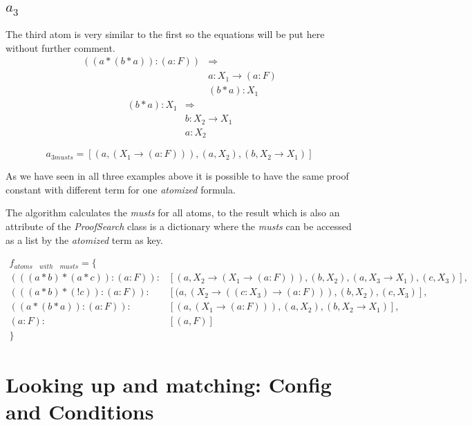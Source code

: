 \subsection[Third atom]{$a_3$}
The third atom is very similar to the first so the equations will be put here without further comment.
\begin{equation}\label{example_atom3_must}
\begin{split}
	((a*(b * a)):(a:F)) & \Rightarrow \\
	& a : X_1 \rightarrow (a:F) \\
	& (b * a) : X_1
\end{split}
\end{equation}
\begin{equation}\label{example_atom3_must2}
\begin{split}
	(b * a) : X_1  & \Rightarrow \\
	& b: X_2 \rightarrow X_1  \\
	& a: X_2
\end{split}
\end{equation}

\begin{equation}
	a_{3 musts} = [(a, (X_1 \rightarrow (a:F))), (a, X_2), (b, X_2 \rightarrow X_1)]
\end{equation}

As we have seen in all three examples above it is possible to have the same proof constant with different term for one \emph{atomized} formula.

\bigskip
The algorithm calculates the \emph{musts} for all atoms, to the result which is also an attribute of the \emph{ProofSearch} class is a dictionary where the \emph{musts} can be accessed as a list by the \emph{atomized} term as key.

\begin{equation}\label{f_musts}
\begin{split}
	f_{atoms \quad with \quad musts} = \{\\
	(((a * b)*(a * c)):(a:F)): & [(a, X_2 \rightarrow (X_1 \rightarrow (a:F))), (b, X_2), (a, X_3 \rightarrow X_1), (c, X_3)], \\
	 (((a * b)*(! c)):(a:F)): & [(a, (X_2 \rightarrow ((c:X_3) \rightarrow (a:F))), (b, X_2), (c, X_3)], \\
	 ((a*(b * a)):(a:F)): & [(a, (X_1 \rightarrow (a:F))), (a, X_2), (b, X_2 \rightarrow X_1 )], \\
	 (a:F): & [(a, F)]\\
	\}
\end{split}
\end{equation}
%

\section{Looking up and matching: Config and Conditions}
